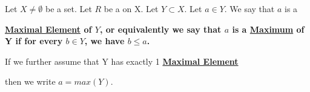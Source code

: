 \label{def:MaximalElement}
\newcommand{\MaximalElement}[0]{
    \bf \hyperref[def:MaximalElement]{Maximal Element} \rm
}

\newcommand{\Maximum}[0]{
    \bf \hyperref[def:MaximalElement]{Maximum} \rm
}

\begin{df}
    Let $X \neq \emptyset$ be a set. 
    Let $R$ be a \Relation on X. 
    Let $Y \subset X$.
    Let $a \in Y$. 
    We say that $a$ is a 
    \MaximalElement of $Y$, 
    or equivalently we say that 
    $a$ is a \Maximum of Y 
    if for every $b \in Y$, 
    we have $b \leq a$. 
    
    If we further assume that 
    Y has exactly 1 \MaximalElement 
    then we write 
    $a=max(Y)$. 
\end{df}